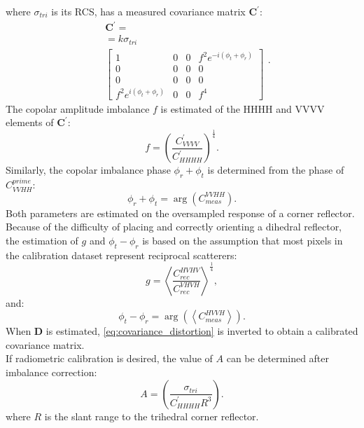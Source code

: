 where $\sigma_{tri}$ is its RCS, has a measured covariance matrix $\mathbf{C^{\prime}}$:
\begin{equation}
	\begin{aligned}
	&\mathbf{C^{\prime}} =\\
	&= k \sigma_{tri}\\
	&\begin{bmatrix}
		1 & 0 & 0 & f^2 e^{-i \left(\phi_t + \phi_r\right)}\\
		0 & 0 & 0 & 0\\
		0 & 0 & 0 & 0\\
		f^2 e^{i \left(\phi_t + \phi_r\right)} & 0 & 0 & f^4
	\end{bmatrix}
	\end{aligned}.
\end{equation}
The copolar amplitude imbalance $f$ is estimated of the HHHH and VVVV elements of $\mathbf{C^{\prime}}$:
\begin{equation}
	f = \left(\frac{C^{\prime}_{VVVV}}{C^{\prime}_{HHHH}}\right)^{\frac{1}{4}}.
\end{equation}
Similarly, the copolar imbalance phase $\phi_r + \phi_t$ is determined from the phase of $C_{VVHH}^{prime}$:
\begin{equation}
	\phi_r + \phi_t = \operatorname{arg}\left(C_{meas}^{VVHH}\right).
\end{equation}
Both parameters are estimated on the oversampled response of a corner reflector.
Because of the difficulty of placing and correctly orienting a dihedral reflector, the estimation of $g$ and $\phi_t - \phi_r$ is based on the assumption that most pixels in the calibration dataset represent reciprocal scatterers:
\begin{equation}
	g = \left<\frac{C_{rec}^{HVHV}}{C_{rec}^{VHVH}}\right>^\frac{1}{4},
\end{equation}
and:
\begin{equation}
	\phi_t - \phi_r =\operatorname{arg}\left( \left<C_{meas}^{HVVH}\right>\right).
\end{equation}
When $\mathbf{D}$ is estimated, \autoref{eq:covariance_distortion} is inverted to obtain a calibrated covariance matrix.\\
If radiometric calibration is desired, the value of $A$ can be determined after imbalance correction:
\begin{equation}
	A =	\left(\frac{\sigma_{tri}}{C^{\prime}_{HHHH} R^{3}}\right).
\end{equation}
where $R$ is the slant range to the trihedral corner reflector.
